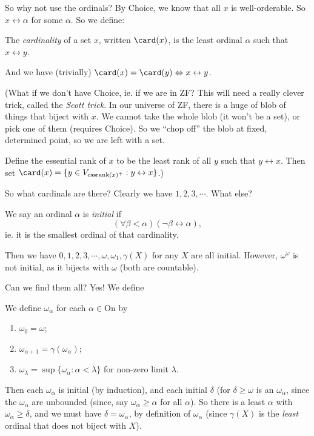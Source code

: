 \documentclass[a4paper]{article}
\begin{document}
So why not use the ordinals? By Choice, we know that all $x$ is well-orderable. So $x\leftrightarrow \alpha$ for some $\alpha$. So we define:
\begin{defi}[Cardinality]
  The \emph{cardinality} of a set $x$, written $\card(x)$, is the least ordinal $\alpha$ such that $x\leftrightarrow y$.
\end{defi}
And we have (trivially) $\card(x) = \card(y) \Leftrightarrow x\leftrightarrow y$.

(What if we don't have Choice, ie. if we are in ZF? This will need a really clever trick, called the \emph{Scott trick}. In our universe of ZF, there is a huge of blob of things that biject with $x$. We cannot take the whole blob (it won't be a set), or pick one of them (requires Choice). So we ``chop off'' the blob at fixed, determined point, so we are left with a set.

Define the essential rank of $x$ to be the least rank of all $y$ such that $y\leftrightarrow x$. Then set $\card (x) = \{y\in V_{\mathrm{essrank}(x)^+}: y\leftrightarrow x\}$.)

So what cardinals are there? Clearly we have $1, 2, 3, \cdots$. What else?

\begin{defi}
  We say an ordinal $\alpha$ is \emph{initial} if
  \[
    (\forall \beta < \alpha)(\neg \beta \leftrightarrow \alpha),
  \]
  ie. it is the smallest ordinal of that cardinality.
\end{defi}

Then we have $0, 1, 2, 3, \cdots, \omega, \omega_1, \gamma(X)$ for any $X$ are all initial. However, $\omega^\omega$ is not initial, as it bijects with $\omega$ (both are countable).

Can we find them all? Yes! We define
\begin{defi}
  We define $\omega_\alpha$ for each $\alpha \in \mathrm{On}$ by
  \begin{enumerate}
    \item $\omega_0 = \omega$;
    \item $\omega_{\alpha + 1} = \gamma(\omega_\alpha)$;
    \item $\omega_\lambda = \sup\{\omega_\alpha: \alpha < \lambda\}$ for non-zero limit $\lambda$.
  \end{enumerate}
\end{defi}
Then each $\omega_\alpha$ is initial (by induction), and each initial $\delta$ (for $\delta \geq \omega$ is an $\omega_\alpha$, since the $\omega_\alpha$ are unbounded (since, say $\omega_\alpha \geq \alpha$ for all $\alpha$). So there is a least $\alpha$ with $\omega_\alpha \geq \delta$, and we must have $\delta = \omega_\alpha$, by definition of $\omega_\alpha$ (since $\gamma(X)$ is the \emph{least} ordinal that does not biject with $X$).
\end{document}
